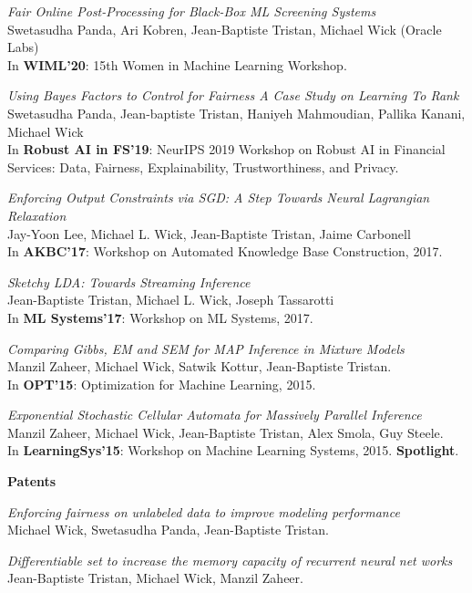 \documentclass[margin,line]{res}
\begin{document}
\begin{resume}
\emph{Fair Online Post-Processing for Black-Box ML Screening Systems}\\
Swetasudha Panda, Ari Kobren, Jean-Baptiste Tristan, Michael Wick (Oracle Labs)\\
In {\bf WIML'20}: 15th Women in Machine Learning Workshop.

\emph{Using Bayes Factors to Control for Fairness A Case Study on Learning To Rank}\\
Swetasudha Panda, Jean-baptiste Tristan, Haniyeh Mahmoudian, Pallika Kanani, Michael Wick\\
In {\bf Robust AI in FS'19}: NeurIPS 2019 Workshop on Robust AI in Financial Services: Data, Fairness, Explainability, Trustworthiness, and Privacy.

\emph{Enforcing Output Constraints via SGD: A Step Towards Neural Lagrangian Relaxation}\\
Jay-Yoon Lee, Michael L. Wick, Jean-Baptiste Tristan, Jaime Carbonell\\
In {\bf AKBC'17}: Workshop on Automated Knowledge Base Construction, 2017.

\emph{Sketchy LDA: Towards Streaming Inference}\\
Jean-Baptiste Tristan, Michael L. Wick, Joseph Tassarotti\\
In {\bf ML Systems'17}: Workshop on ML Systems, 2017.

\emph{Comparing Gibbs, EM and SEM for MAP Inference in Mixture Models}\\
Manzil Zaheer, Michael Wick, Satwik Kottur, Jean-Baptiste Tristan.\\
In {\bf OPT'15}: Optimization for Machine Learning, 2015. 

\emph{Exponential Stochastic Cellular Automata for Massively Parallel Inference}\\
Manzil Zaheer, Michael Wick, Jean-Baptiste Tristan, Alex Smola, Guy Steele.\\
In {\bf LearningSys'15}: Workshop on Machine Learning Systems, 2015. {\bf Spotlight}. 

\newpage
  {\bf {\Large Patents}}

\emph{Enforcing fairness on unlabeled data to improve modeling performance}\\
Michael Wick, Swetasudha Panda, Jean-Baptiste Tristan.  
  
\emph{Differentiable set to increase the memory capacity of recurrent neural net works}\\
Jean-Baptiste Tristan, Michael Wick, Manzil Zaheer.  
  

\end{resume}
\end{document}
